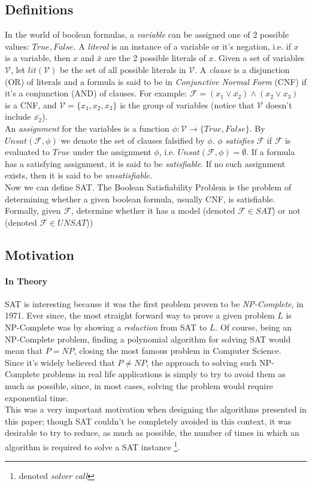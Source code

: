 \documentclass[]{article}
\begin{document}
	\subsection{Definitions}
	In the world of boolean formulas, a \textit{variable} can be assigned one of 2 possible values: $ True, False $. A \textit{literal} is an instance of a variable or it's negation, i.e. if $ x $ is a variable, then $ x $ and $ \bar{x} $ are the 2 possible literals of $ x $. Given a set of variables $ \mathcal{V} $, let $ lit(\mathcal{V}) $ be the set of all possible literals in $ \mathcal{V} $. A \textit{clause} is a disjunction (OR) of literals and a formula is said to be in \textit{Conjunctive Normal Form} (CNF) if it's a conjunction (AND) of clauses. For example: $\mathcal{F} = (x_1 \lor \bar{x_2}) \land (x_2 \lor x_3) $ is a CNF, and $ \mathcal{V}=\{x_1,x_2,x_3\} $ is the group of variables (notice that $ \mathcal{V} $ doesn't include $ \bar{x_2} $). \\ An \textit{assignment} for the variables is a function $ \phi : \mathcal{V} \rightarrow \{True, False\} $.  By $ Unsat(\mathcal{F},\phi) $ we denote the set of clauses falsified by $ \phi $. $ \phi $ \textit{satisfies} $ \mathcal{F} $ if $ \mathcal{F} $ is evaluated to $ True $ under the assignment $ \phi $, i.e. $ Unsat(\mathcal{F},\phi) = \emptyset $. If a formula has a satisfying assignment, it is said to be \textit{satisfiable}. If no such assignment exists, then it is said to be \textit{unsatisfiable}. \\
	Now we can define SAT. The Boolean Satisfiability Problem is the problem of determining whether a given boolean formula, usually CNF, is satisfiable. Formally, given $ \mathcal{F} $, determine whether it has a model (denoted $ \mathcal{F} \in SAT $) or not (denoted $ \mathcal{F} \in UNSAT $))
	\subsection{Motivation}
	\paragraph{In Theory} SAT is interesting because it was the first problem proven to be \textit{NP-Complete}, in 1971. Ever since, the most straight forward way to prove a given problem $ L $ is NP-Complete was by showing a \textit{reduction} from SAT to $ L $. Of course, being an NP-Complete problem, finding a polynomial algorithm for solving SAT would mean that $ P=NP $, closing the most famous problem in Computer Science.\\Since it's widely believed that $ P \neq NP $, the approach to solving such NP-Complete problems in real life applications is simply to try to avoid them as much as possible, since, in most cases, solving the problem would require exponential time. \\
	This was a very important motivation when designing the algorithms presented in this paper; though SAT couldn't be completely avoided in this context, it was desirable to try to reduce, as much as possible, the number of times in which an algorithm is required to solve a SAT instance \footnote{denoted \textit{solver call}}.	\pagebreak
\end{document}
